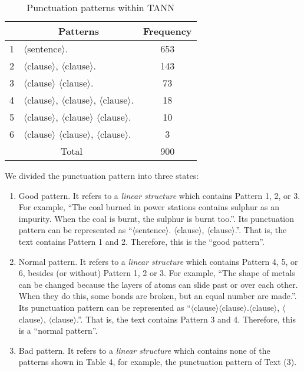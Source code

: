 \documentclass[english]{jnlp_1.2.0}
\begin{document}
\begin{table}[b]
\caption{Punctuation patterns within TANN}
\begin{center}
 \begin{tabular}{|c|l|c|}      \hline
    & \multicolumn{1}{c|}{Patterns}          & Frequency   \\ \hline \hline
 1  & $\langle$sentence$\rangle$.                         & 653         \\ 
 2  & $\langle$clause$\rangle$, $\langle$clause$\rangle$.               & 143         \\ 
 3  & $\langle$clause$\rangle$ $\langle$clause$\rangle$.                & 73          \\ 
 4  & $\langle$clause$\rangle$, $\langle$clause$\rangle$, $\langle$clause$\rangle$.   & 18          \\ 
 5  & $\langle$clause$\rangle$, $\langle$clause$\rangle$ $\langle$clause$\rangle$.    & 10          \\ 
 6  & $\langle$clause$\rangle$ $\langle$clause$\rangle$, $\langle$clause$\rangle$.    & 3           \\ \hline \hline 
  \multicolumn{2}{|c|}{Total}               & 900 \\   \hline 
\end{tabular}
\end{center}
\end{table}

We divided the punctuation pattern into three states: 

\begin{enumerate}
   \item Good pattern. It refers to a \textit{linear structure} which 
   contains Pattern 1, 2, or 3. For example, ``The coal burned 
   in power stations contains sulphur as an impurity. When the coal is 
   burnt, the sulphur is burnt too.''. Its punctuation pattern can be 
   represented as ``$\langle$sentence$\rangle$. $\langle$clause$\rangle$, $\langle$clause$\rangle$.''. That is, the text 
   contains Pattern 1 and 2. Therefore, this is the ``good pattern''. 
   \item Normal pattern. It refers to a \textit{linear structure} which contains
   Pattern 4, 5, or 6, besides (or without) Pattern 1, 2 or 3. For example,
   ``The shape of metals can be changed because the layers of atoms can
   slide past or over each other. When they do this, some bonds are
   broken, but an equal number are made.''. Its punctuation pattern
   can be represented as ``$\langle$clause$\rangle$$\langle$clause$\rangle$.$\langle$clause$\rangle$, $\langle$clause$\rangle$, $\langle$clause$\rangle$.''.
   That is, the text contains Pattern 3 and 4. Therefore, this is a 
   ``normal pattern''.
   \item Bad pattern. It refers to a \textit{linear structure} which
   contains none of the patterns shown in Table 4, for example, 
   the punctuation pattern of Text (3).
\end{enumerate}
\end{document}
